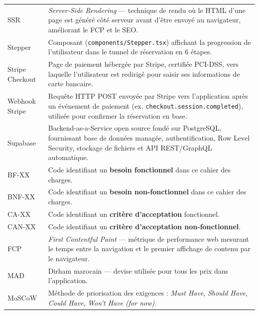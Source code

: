 \documentclass[12pt,a4paper,openany]{report}
\begin{document}
\begin{longtable}{lp{10cm}}
  SSR               & \textit{Server-Side Rendering} — technique de rendu où le HTML d'une page est généré côté serveur avant d'être envoyé au navigateur, améliorant le FCP et le SEO. \\[4pt]

  Stepper           & Composant (\texttt{components/Stepper.tsx}) affichant la progression de l'utilisateur dans le tunnel de réservation en 6 étapes. \\[4pt]

  Stripe Checkout   & Page de paiement hébergée par Stripe, certifiée PCI-DSS, vers laquelle l'utilisateur est redirigé pour saisir ses informations de carte bancaire. \\[4pt]

  Webhook Stripe    & Requête HTTP POST envoyée par Stripe vers l'application après un événement de paiement (ex. \texttt{checkout.session.completed}), utilisée pour confirmer la réservation en base. \\[4pt]

  Supabase          & Backend-as-a-Service open source fondé sur PostgreSQL, fournissant base de données managée, authentification, Row Level Security, stockage de fichiers et API REST/GraphQL automatique. \\[4pt]

  BF-XX             & Code identifiant un \textbf{besoin fonctionnel} dans ce cahier des charges. \\[4pt]

  BNF-XX            & Code identifiant un \textbf{besoin non-fonctionnel} dans ce cahier des charges. \\[4pt]

  CA-XX             & Code identifiant un \textbf{critère d'acceptation} fonctionnel. \\[4pt]

  CAN-XX            & Code identifiant un \textbf{critère d'acceptation non-fonctionnel}. \\[4pt]

  FCP               & \textit{First Contentful Paint} — métrique de performance web mesurant le temps entre la navigation et le premier affichage de contenu par le navigateur. \\[4pt]

  MAD               & Dirham marocain — devise utilisée pour tous les prix dans l'application. \\[4pt]

  MoSCoW            & Méthode de priorisation des exigences : \textit{Must Have}, \textit{Should Have}, \textit{Could Have}, \textit{Won't Have (for now)}. \\
\end{longtable}

\end{document}
